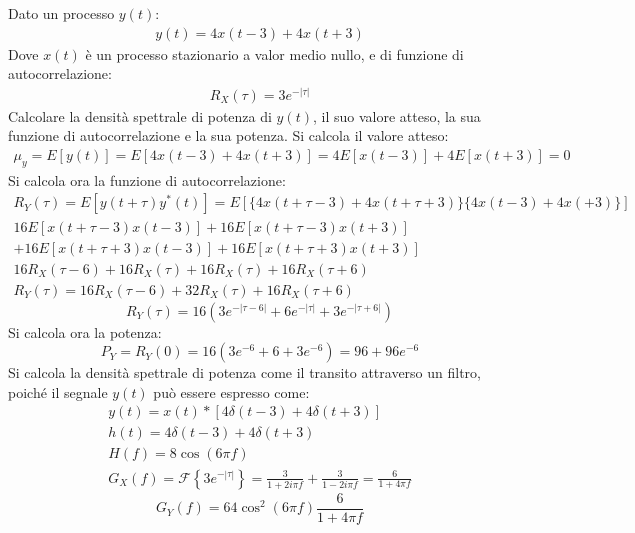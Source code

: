 \documentclass{article}
\begin{document}
Dato un processo $y(t)$:
\begin{gather*}
    y(t)=4x(t-3)+4x(t+3)
\end{gather*}
Dove $x(t)$ è un processo stazionario a valor medio nullo, e di funzione di autocorrelazione:
\begin{gather*}
    R_X(\tau)=3e^{-|\tau|}
\end{gather*}
Calcolare la densità spettrale di potenza di $y(t)$, il suo valore atteso, la sua funzione di autocorrelazione e la sua potenza. 
Si calcola il valore atteso:
\begin{gather}
    \mu_y=E[y(t)]=E[4x(t-3)+4x(t+3)]=4E[x(t-3)]+4E[x(t+3)]=0
\end{gather}
Si calcola ora la funzione di autocorrelazione:
\begin{gather*}
    R_Y(\tau)=E[y(t+\tau)y^*(t)]=E[\{4x(t+\tau-3)+4x(t+\tau+3)\}\{4x(t-3)+4x(+3)\}]\\
    16E[x(t+\tau-3)x(t-3)]+16E[x(t+\tau-3)x(t+3)]\\
    +16E[x(t+\tau+3)x(t-3)]+16E[x(t+\tau+3)x(t+3)]\\
    16R_X(\tau-6)+16R_X(\tau)+16R_X(\tau)+16R_X(\tau+6)\\
    R_Y(\tau)=16R_X(\tau-6)+32R_X(\tau)+16R_X(\tau+6)
\end{gather*}
\begin{equation}
    R_Y(\tau)=16\left(3e^{-|\tau-6|}+6e^{-|\tau|}+3e^{-|\tau+6|}\right)
\end{equation}
Si calcola ora la potenza:
\begin{equation}
    P_Y=R_Y(0)=16(3e^{-6}+6+3e^{-6})=96+96e^{-6}
\end{equation}
Si calcola la densità spettrale di potenza come il transito attraverso un filtro, poiché il segnale $y(t)$ può essere espresso come:
\begin{gather*}
    y(t)=x(t)*[4\delta(t-3)+4\delta(t+3)]\\
    h(t)=4\delta(t-3)+4\delta(t+3)\\
    H(f)=\displaystyle8\cos(6\pi f)\\
    G_X(f)=\mathscr{F}\left\{3e^{-|\tau|}\right\}=\displaystyle\frac{3}{1+2i\pi f}+\frac{3}{1-2i\pi f}=\frac{6}{1+4\pi f}
\end{gather*}
\begin{equation}
    G_Y(f)=64\cos^2(6\pi f)\displaystyle\frac{6}{1+4\pi f}
\end{equation}
\end{document}
